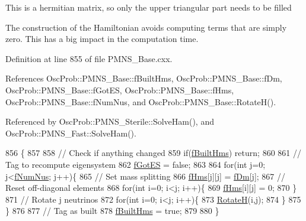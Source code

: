 This is a hermitian matrix, so only the upper triangular part needs to be filled

The construction of the Hamiltonian avoids computing terms that are simply zero. This has a big impact in the computation time. 

Definition at line 855 of file P\+M\+N\+S\+\_\+\+Base.\+cxx.



References Osc\+Prob\+::\+P\+M\+N\+S\+\_\+\+Base\+::f\+Built\+Hms, Osc\+Prob\+::\+P\+M\+N\+S\+\_\+\+Base\+::f\+Dm, Osc\+Prob\+::\+P\+M\+N\+S\+\_\+\+Base\+::f\+Got\+ES, Osc\+Prob\+::\+P\+M\+N\+S\+\_\+\+Base\+::f\+Hms, Osc\+Prob\+::\+P\+M\+N\+S\+\_\+\+Base\+::f\+Num\+Nus, and Osc\+Prob\+::\+P\+M\+N\+S\+\_\+\+Base\+::\+Rotate\+H().



Referenced by Osc\+Prob\+::\+P\+M\+N\+S\+\_\+\+Sterile\+::\+Solve\+Ham(), and Osc\+Prob\+::\+P\+M\+N\+S\+\_\+\+Fast\+::\+Solve\+Ham().


\begin{DoxyCode}
856 \{
857 
858   \textcolor{comment}{// Check if anything changed}
859   \textcolor{keywordflow}{if}(\hyperlink{classOscProb_1_1PMNS__Base_a9ac3cadeac8db1b90f3152f476244780}{fBuiltHms}) \textcolor{keywordflow}{return};
860 
861   \textcolor{comment}{// Tag to recompute eigensystem}
862   \hyperlink{classOscProb_1_1PMNS__Base_a6dc5cd010d2d70b2324745b4e53e9839}{fGotES} = \textcolor{keyword}{false};
863 
864   \textcolor{keywordflow}{for}(\textcolor{keywordtype}{int} j=0; j<\hyperlink{classOscProb_1_1PMNS__Base_a24bb74bed63569dfe88b18fa6a08060e}{fNumNus}; j++)\{
865     \textcolor{comment}{// Set mass splitting}
866     \hyperlink{classOscProb_1_1PMNS__Base_adf5901166216e8c7a5cff2092952f473}{fHms}[j][j] = \hyperlink{classOscProb_1_1PMNS__Base_a406a31c3b5d620e5a0cace5b411f9f70}{fDm}[j];
867     \textcolor{comment}{// Reset off-diagonal elements}
868     \textcolor{keywordflow}{for}(\textcolor{keywordtype}{int} i=0; i<j; i++)\{
869       \hyperlink{classOscProb_1_1PMNS__Base_adf5901166216e8c7a5cff2092952f473}{fHms}[i][j] = 0;
870     \}
871     \textcolor{comment}{// Rotate j neutrinos}
872     \textcolor{keywordflow}{for}(\textcolor{keywordtype}{int} i=0; i<j; i++)\{
873       \hyperlink{classOscProb_1_1PMNS__Base_aae18afd69074211335f49ec40e6011b9}{RotateH}(i,j);
874     \}
875   \}
876 
877   \textcolor{comment}{// Tag as built}
878   \hyperlink{classOscProb_1_1PMNS__Base_a9ac3cadeac8db1b90f3152f476244780}{fBuiltHms} = \textcolor{keyword}{true};
879 
880 \}
\end{DoxyCode}
\mbox{\label{classOscProb_1_1PMNS__Base_aefe521239031c418cfaaaa550a6e13bb}} 
